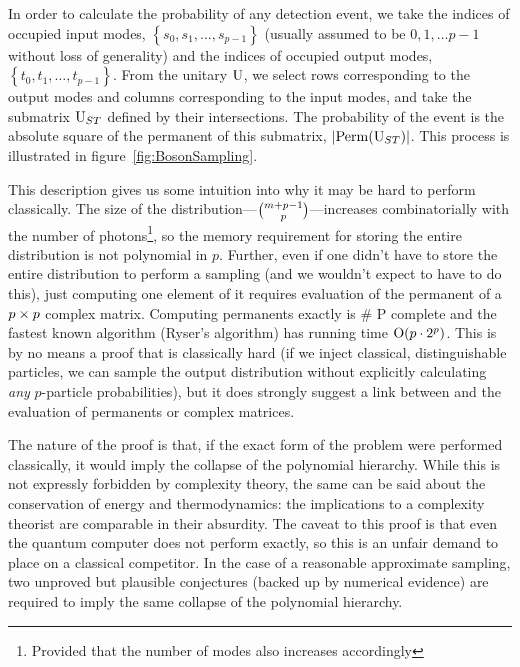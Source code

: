 In order to calculate the probability of any detection event, we take the
indices of occupied input modes, \(\left\{ s_{0}, s_{1}, \dots, s_{p-1} \right\}
\) (usually assumed to be \(0, 1, \dots p-1\) without loss of generality) and
the indices of occupied output modes, \(\left\{ t_{0}, t_{1}, \dots, t_{p-1}
\right\}\). From the unitary \(\mathrm{U}\), we select rows corresponding to the
output modes and columns corresponding to the input modes, and take the
submatrix \(\mathrm{U}_{ST}\) defined by their intersections. The probability of
the event is the absolute square of the permanent of this submatrix, \(\left|
\mathrm{Perm} \!\left( \mathrm{U}_{ST} \right)\right| \). This process is illustrated in
figure~\ref{fig:BosonSampling}.

This description gives us some intuition into why it may be hard to perform
\bosonsampling{} classically. The size of the distribution---\( {m+p-1}\choose{p}
\)---increases combinatorially with the number of photons\footnote{Provided that
the number of modes also increases accordingly}, so the memory requirement for
storing the entire distribution is not polynomial in \(p\). Further, even if one
didn't have to store the entire distribution to perform a sampling (and we
wouldn't expect to have to do this), just computing one element of it requires
evaluation of the permanent of a \(p \times p\) complex matrix. Computing
permanents exactly is \# P complete \cite{valiant} and the fastest known
algorithm (Ryser's algorithm) has running time \(\mathrm{O} \!\left( p \cdot 2^{p} \right)\).
This is
by no means a proof that \bosonsampling{} is classically hard (if we inject
classical, distinguishable particles, we can sample the output distribution
without explicitly calculating \emph{any} \(p\)-particle probabilities), but it
does strongly suggest a link between \bosonsampling{} and the evaluation of
permanents or complex matrices.

The nature of the proof is that, if
the exact form of the \bosonsampling{} problem were performed classically, it
would imply the collapse of the polynomial hierarchy. While this is not
expressly forbidden by complexity theory, the same can be said about the
conservation of energy and thermodynamics: the implications to a complexity
theorist are comparable in their absurdity. The caveat to this proof is that
even the quantum computer does not
perform \bosonsampling{} exactly, so this is an unfair demand to place on a
classical competitor. In the case of a reasonable approximate sampling, two
unproved
but plausible conjectures (backed up by numerical evidence) are required to
imply the same collapse of the polynomial hierarchy.

